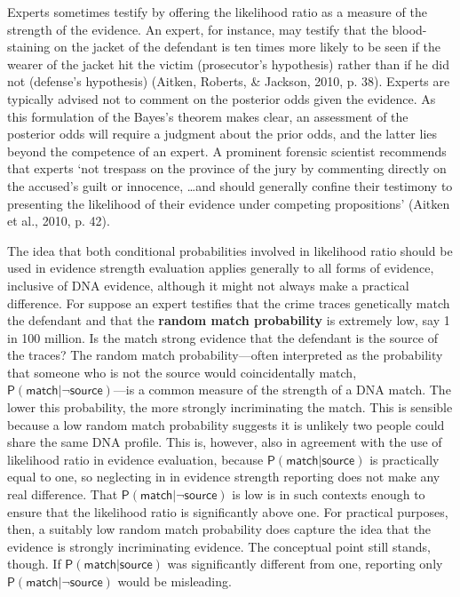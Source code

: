 \documentclass[10pt,dvipsnames,enabledeprecatedfontcommands]{scrartcl}
\newcommand{\pr}[1]{\mathsf{P}(#1)}
\begin{document}
Experts sometimes testify by offering the likelihood ratio as a measure
of the strength of the evidence. An expert, for instance, may testify
that the blood-staining on the jacket of the defendant is ten times more
likely to be seen if the wearer of the jacket hit the victim
(prosecutor's hypothesis) rather than if he did not (defense's
hypothesis) (Aitken, Roberts, \& Jackson, 2010, p. 38). Experts are
typically advised not to comment on the posterior odds given the
evidence. As this formulation of the Bayes's theorem makes clear, an
assessment of the posterior odds will require a judgment about the prior
odds, and the latter lies beyond the competence of an expert. A
prominent forensic scientist recommends that experts `not trespass on
the province of the jury by commenting directly on the accused's guilt
or innocence, \dots and should generally confine their testimony to
presenting the likelihood of their evidence under competing
propositions' (Aitken et al., 2010, p. 42).

The idea that both conditional probabilities involved in likelihood
ratio should be used in evidence strength evaluation applies generally
to all forms of evidence, inclusive of DNA evidence, although it might
not always make a practical difference. For suppose an expert testifies
that the crime traces genetically match the defendant and that the
\textbf{random match probability} is extremely low, say 1 in 100
million. Is the match strong evidence that the defendant is the source
of the traces? The random match probability---often interpreted as the
probability that someone who is not the source would coincidentally
match, \(\pr{\textsf{match} \vert \neg \textsf{source}}\)---is a common
measure of the strength of a DNA match. The lower this probability, the
more strongly incriminating the match. This is sensible because a low
random match probability suggests it is unlikely two people could share
the same DNA profile. This is, however, also in agreement with the use
of likelihood ratio in evidence evaluation, because
\(\pr{\textsf{match} \vert \textsf{source}}\) is practically equal to
one, so neglecting in in evidence strength reporting does not make any
real difference. That \(\pr{\textsf{match} \vert \neg \textsf{source}}\)
is low is in such contexts enough to ensure that the likelihood ratio is
significantly above one. For practical purposes, then, a suitably low
random match probability does capture the idea that the evidence is
strongly incriminating evidence. The conceptual point still stands,
though. If \(\pr{\textsf{match} \vert \textsf{source}}\) was
significantly different from one, reporting only
\(\pr{\textsf{match} \vert \neg \textsf{source}}\) would be misleading.
\end{document}
